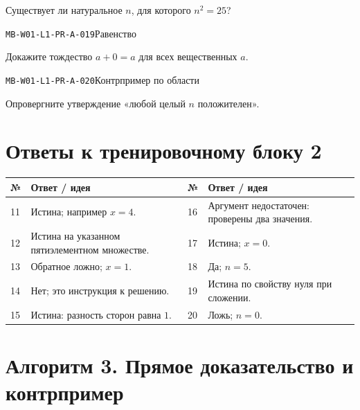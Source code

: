 \documentclass[11pt,a4paper,openany]{book}
\newcommand{\muid}[1]{\texttt{\footnotesize #1}}
\renewcommand{\arraystretch}{1.38}
\begin{document}
Существует ли натуральное $n$, для которого $n^2=25$?\par\medskip

\noindent\hypertarget{MB-W01-L1-PR-A-019}{}\muid{MB-W01-L1-PR-A-019}\quad Равенство\par

Докажите тождество $a+0=a$ для всех вещественных $a$.\par\medskip

\noindent\hypertarget{MB-W01-L1-PR-A-020}{}\muid{MB-W01-L1-PR-A-020}\quad Контрпример по области\par

Опровергните утверждение «любой целый $n$ положителен».\par\medskip

\clearpage\section*{Ответы к тренировочному блоку 2}


\begingroup\footnotesize\renewcommand{\arraystretch}{1.45}

\begin{tabularx}{\textwidth}{@{}p{10mm}X p{10mm}X@{}}\toprule № & Ответ / идея & № & Ответ / идея\\\midrule

11 & Истина; например $x=4$. & 16 & Аргумент недостаточен: проверены два значения.\\

12 & Истина на указанном пятиэлементном множестве. & 17 & Истина; $x=0$.\\

13 & Обратное ложно; $x=1$. & 18 & Да; $n=5$.\\

14 & Нет; это инструкция к решению. & 19 & Истина по свойству нуля при сложении.\\

15 & Истина: разность сторон равна $1$. & 20 & Ложь; $n=0$.\\

\bottomrule\end{tabularx}\endgroup

\clearpage{}

\section*{Алгоритм 3. Прямое доказательство и контрпример}
\end{document}
